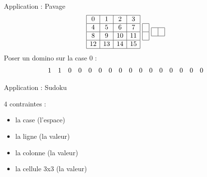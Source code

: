 \documentclass{beamer}
\begin{document}
\begin{frame}{Application : Pavage}
\[
  \begin{array}{|c|c|c|c|}
		\hline
   	0 & 1 & 2 & 3 \\
		\hline
    4	& 5 & 6 & 7 \\
		\hline
   	8 & 9 & 10 & 11 \\
		\hline
   	12 & 13 & 14 & 15 \\
		\hline
\end{array}
	\textrm{ }
\begin{array}{ |c| }
	\hline
		\\
	\hline
    \\
	\hline
  \end{array}
	\textrm{ }
\begin{array}{ |c|c| }
	\hline
		& \\ 
	\hline
  \end{array}
\]
Poser un domino sur la case 0 :
\[
  \begin{array}{ c c c c c c c c c c c c c c c c }
	1 & 1 & 0 & 0 & 0 & 0 & 0 & 0 & 0 & 0 & 0 & 0 & 0 & 0 & 0 & 0 
  \end{array}
\]
\end{frame}



\begin{frame}{Application : Sudoku}

\begin{figure}[h]
\end{figure}

4 contraintes : 
\begin{itemize}
\item la case (l'espace)
\item la ligne (la valeur)
\item la colonne (la valeur)
\item la cellule 3x3 (la valeur)
\end{itemize}
\end{frame}
\end{document}
